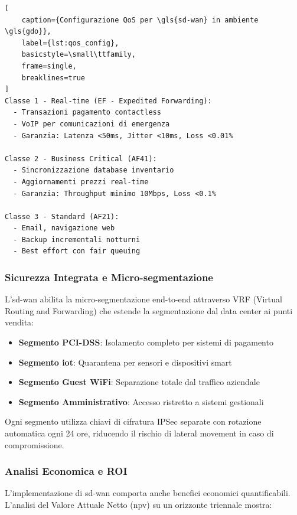 \begin{lstlisting}[
    caption={Configurazione QoS per \gls{sd-wan} in ambiente \gls{gdo}},
    label={lst:qos_config},
    basicstyle=\small\ttfamily,
    frame=single,
    breaklines=true
]
Classe 1 - Real-time (EF - Expedited Forwarding):
  - Transazioni pagamento contactless
  - VoIP per comunicazioni di emergenza
  - Garanzia: Latenza <50ms, Jitter <10ms, Loss <0.01%

Classe 2 - Business Critical (AF41):
  - Sincronizzazione database inventario
  - Aggiornamenti prezzi real-time
  - Garanzia: Throughput minimo 10Mbps, Loss <0.1%

Classe 3 - Standard (AF21):
  - Email, navigazione web
  - Backup incrementali notturni
  - Best effort con fair queuing
\end{lstlisting}

\subsubsection{\texorpdfstring{Sicurezza Integrata e Micro-segmentazione}{3.3.1.4 - Sicurezza Integrata e Micro-segmentazione}}

L'\gls{sd-wan} abilita la micro-segmentazione end-to-end attraverso VRF (Virtual Routing and Forwarding) che estende la segmentazione dal data center ai punti vendita:

\begin{itemize}
    \item \textbf{Segmento PCI-DSS}: Isolamento completo per sistemi di pagamento
    \item \textbf{Segmento \gls{iot}}: Quarantena per sensori e dispositivi smart
    \item \textbf{Segmento Guest WiFi}: Separazione totale dal traffico aziendale
    \item \textbf{Segmento Amministrativo}: Accesso ristretto a sistemi gestionali
\end{itemize}

Ogni segmento utilizza chiavi di cifratura IPSec separate con rotazione automatica ogni 24 ore, riducendo il rischio di lateral movement in caso di compromissione.

\subsubsection{\texorpdfstring{Analisi Economica e ROI}{3.3.1.5 - Analisi Economica e ROI}}

L'implementazione di \gls{sd-wan} comporta anche benefici economici quantificabili. L'analisi del Valore Attuale Netto (\gls{npv}) su un orizzonte triennale mostra:

